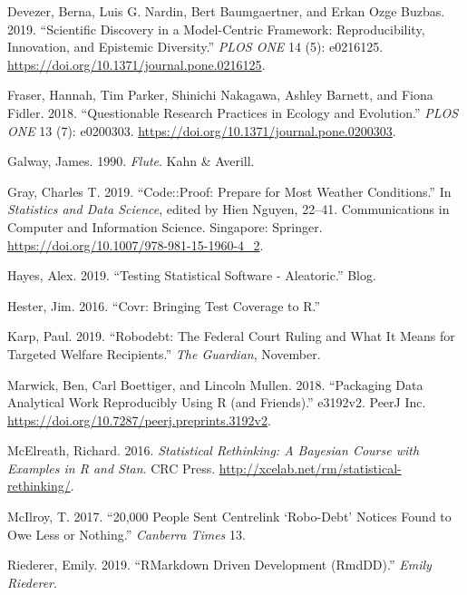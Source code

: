 \documentclass[
]{article}
\newlength{\cslhangindent}
\newenvironment{cslreferences}%
  {\setlength{\parindent}{0pt}%
  \everypar{\setlength{\hangindent}{\cslhangindent}}\ignorespaces}%
  {\par}
\begin{document}
\begin{cslreferences}
\leavevmode\hypertarget{ref-devezerScientificDiscoveryModelcentric2019}{}%
Devezer, Berna, Luis G. Nardin, Bert Baumgaertner, and Erkan Ozge Buzbas. 2019. ``Scientific Discovery in a Model-Centric Framework: Reproducibility, Innovation, and Epistemic Diversity.'' \emph{PLOS ONE} 14 (5): e0216125. \url{https://doi.org/10.1371/journal.pone.0216125}.

\leavevmode\hypertarget{ref-fraser_questionable_2018}{}%
Fraser, Hannah, Tim Parker, Shinichi Nakagawa, Ashley Barnett, and Fiona Fidler. 2018. ``Questionable Research Practices in Ecology and Evolution.'' \emph{PLOS ONE} 13 (7): e0200303. \url{https://doi.org/10.1371/journal.pone.0200303}.

\leavevmode\hypertarget{ref-galway_flute_1990}{}%
Galway, James. 1990. \emph{Flute}. Kahn \& Averill.

\leavevmode\hypertarget{ref-grayCodeProofPrepare2019}{}%
Gray, Charles T. 2019. ``Code::Proof: Prepare for Most Weather Conditions.'' In \emph{Statistics and Data Science}, edited by Hien Nguyen, 22--41. Communications in Computer and Information Science. Singapore: Springer. \url{https://doi.org/10.1007/978-981-15-1960-4_2}.

\leavevmode\hypertarget{ref-hayes_testing_2019}{}%
Hayes, Alex. 2019. ``Testing Statistical Software - Aleatoric.'' Blog.

\leavevmode\hypertarget{ref-hester_covr_2016}{}%
Hester, Jim. 2016. ``Covr: Bringing Test Coverage to R.''

\leavevmode\hypertarget{ref-karp_robodebtfederalcourt_2019}{}%
Karp, Paul. 2019. ``Robodebt: The Federal Court Ruling and What It Means for Targeted Welfare Recipients.'' \emph{The Guardian}, November.

\leavevmode\hypertarget{ref-marwick_packaging_2018}{}%
Marwick, Ben, Carl Boettiger, and Lincoln Mullen. 2018. ``Packaging Data Analytical Work Reproducibly Using R (and Friends).'' e3192v2. PeerJ Inc. \url{https://doi.org/10.7287/peerj.preprints.3192v2}.

\leavevmode\hypertarget{ref-statrethinkingbook}{}%
McElreath, Richard. 2016. \emph{Statistical Rethinking: A Bayesian Course with Examples in R and Stan}. CRC Press. \url{http://xcelab.net/rm/statistical-rethinking/}.

\leavevmode\hypertarget{ref-mcilroy201720}{}%
McIlroy, T. 2017. ``20,000 People Sent Centrelink `Robo-Debt' Notices Found to Owe Less or Nothing.'' \emph{Canberra Times} 13.

\leavevmode\hypertarget{ref-riederer_rmarkdowndrivendevelopment_2019}{}%
Riederer, Emily. 2019. ``RMarkdown Driven Development (RmdDD).'' \emph{Emily Riederer}.


\end{cslreferences}
\end{document}
